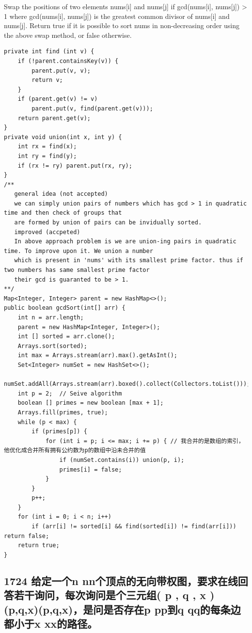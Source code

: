 \documentclass[9pt, b5paper]{article}
\begin{document}
Swap the positions of two elements nums[i] and nums[j] if gcd(nums[i], nums[j]) > 1 where gcd(nums[i], nums[j]) is the greatest common divisor of nums[i] and nums[j].
Return true if it is possible to sort nums in non-decreasing order using the above swap method, or false otherwise.
\begin{verbatim}
private int find (int v) {
    if (!parent.containsKey(v)) {
        parent.put(v, v);
        return v;
    }
    if (parent.get(v) != v)
        parent.put(v, find(parent.get(v)));
    return parent.get(v);
}
private void union(int x, int y) {
    int rx = find(x);
    int ry = find(y);
    if (rx != ry) parent.put(rx, ry);
}
/**
   general idea (not accepted)
   we can simply union pairs of numbers which has gcd > 1 in quadratic time and then check of groups that
   are formed by union of pairs can be invidually sorted. 
   improved (accpeted)
   In above approach problem is we are union-ing pairs in quadratic time. To improve upon it. We union a number
   which is present in 'nums' with its smallest prime factor. thus if two numbers has same smallest prime factor
   their gcd is guaranted to be > 1. 
**/
Map<Integer, Integer> parent = new HashMap<>();
public boolean gcdSort(int[] arr) {
    int n = arr.length;
    parent = new HashMap<Integer, Integer>();
    int [] sorted = arr.clone();
    Arrays.sort(sorted);
    int max = Arrays.stream(arr).max().getAsInt();
    Set<Integer> numSet = new HashSet<>();
    numSet.addAll(Arrays.stream(arr).boxed().collect(Collectors.toList()));
    int p = 2;  // Seive algorithm
    boolean [] primes = new boolean [max + 1];
    Arrays.fill(primes, true);
    while (p < max) {
        if (primes[p]) {
            for (int i = p; i <= max; i += p) { // 我合并的是数组的索引，他优化成合并所有拥有公约数为p的数组中沿未合并的值
                if (numSet.contains(i)) union(p, i);
                primes[i] = false;
            }
        }
        p++;
    }
    for (int i = 0; i < n; i++) 
        if (arr[i] != sorted[i] && find(sorted[i]) != find(arr[i])) return false;
    return true;
}
\end{verbatim}

\subsection{1724 给定一个n nn个顶点的无向带权图，要求在线回答若干询问，每次询问是个三元组( p , q , x ) (p,q,x)(p,q,x)，是问是否存在p pp到q qq的每条边都小于x xx的路径。}
\label{sec-11-6}
\end{document}

